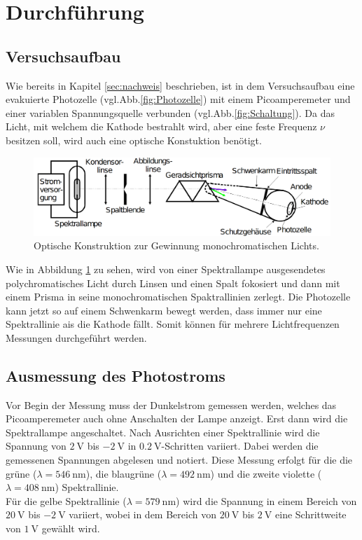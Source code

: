 \section{Durchführung}
\label{sec:Durchführung}

\subsection{Versuchsaufbau}
\label{sec:Aufbau}
Wie bereits in Kapitel \ref{sec:nachweis} beschrieben, ist in dem Versuchsaufbau eine evakuierte Photozelle (vgl.Abb.\ref{fig:Photozelle}) mit einem
Picoamperemeter und einer variablen Spannungsquelle verbunden (vgl.Abb.\ref{fig:Schaltung}). Da das Licht, mit welchem die Kathode 
bestrahlt wird, aber eine feste Frequenz $\nu$ besitzen soll, wird auch eine optische Konstuktion benötigt. 
\begin{figure}
    \centering
    \includegraphics[scale=0.3]{pictures/OptischerTeil.png}
    \caption{Optische Konstruktion zur Gewinnung monochromatischen Lichts. \cite{AP01}}
    \label{fig:optisch}
\end{figure}
Wie in Abbildung \ref{fig:optisch} zu sehen, wird von einer 
Spektrallampe ausgesendetes polychromatisches Licht durch Linsen und einen Spalt fokosiert und dann mit einem Prisma in seine monochromatischen
Spaktrallinien zerlegt. Die Photozelle kann jetzt so auf einem Schwenkarm bewegt werden, dass immer nur eine Spektrallinie ais die Kathode
fällt. Somit können für mehrere Lichtfrequenzen Messungen durchgeführt werden. 

\subsection{Ausmessung des Photostroms}
\label{sec:ausmessen}
Vor Begin der Messung muss der Dunkelstrom gemessen werden, welches das Picoamperemeter auch ohne Anschalten der Lampe anzeigt. Erst dann 
wird die Spektrallampe angeschaltet. Nach Ausrichten einer Spektrallinie wird die Spannung von $\SI{2}{\volt}$ bis $\SI{-2}{\volt}$ in 
$\SI{0.2}{\volt}$-Schritten variiert. Dabei werden die gemessenen Spannungen abgelesen und notiert. Diese Messung erfolgt für die 
die grüne ($\lambda=\SI{546}{\nano\metre}$), die blaugrüne ($\lambda=\SI{492}{\nano\metre}$) und die zweite violette 
($\lambda=\SI{408}{\nano\metre}$) Spektrallinie. 
\\\noindent
Für die gelbe Spektrallinie ($\lambda=\SI{579}{\nano\metre}$) wird die Spannung in einem Bereich von $\SI{20}{\volt}$ bis $\SI{-2}{\volt}$
variiert, wobei in dem Bereich von $\SI{20}{\volt}$ bis $\SI{2}{\volt}$ eine Schrittweite von $\SI{1}{\volt}$ gewählt wird. 